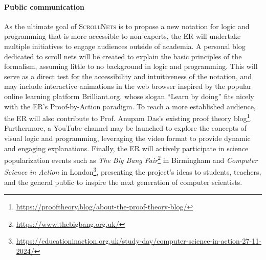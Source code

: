 \documentclass[11pt]{msca-pf}
\newcommand{\proj}{\small\textsc{ScrollNets}}
\begin{document}
\paragraph{Public communication}
As the ultimate goal of {\proj} is to propose a new notation for logic and programming that is more
accessible to non-experts, the ER will undertake multiple initiatives to engage audiences outside of
academia. A personal blog dedicated to scroll nets will be created to explain the basic principles
of the formalism, assuming little to no background in logic and programming. This will serve as a
direct test for the accessibility and intuitiveness of the notation, and may include interactive
animations in the web browser inspired by the popular online learning platform Brilliant.org, whose
slogan ``Learn by doing'' fits nicely with the ER's Proof-by-Action paradigm. To reach a more
established audience, the ER will also contribute to Prof. Anupam Das's existing proof theory
blog\footnote{\url{https://prooftheory.blog/about-the-proof-theory-blog/}}. Furthermore, a YouTube
channel may be launched to explore the concepts of visual logic and programming, leveraging the
video format to provide dynamic and engaging explanations. Finally, the ER will actively participate
in science popularization events such as \emph{The Big Bang
Fair}\footnote{\url{https://www.thebigbang.org.uk/}} in Birmingham and \emph{Computer Science in
Action} in
London\footnote{\url{https://educationinaction.org.uk/study-day/computer-science-in-action-27-11-2024/}},
presenting the project's ideas to students, teachers, and the general public to inspire the next
generation of computer scientists.




\end{document}
